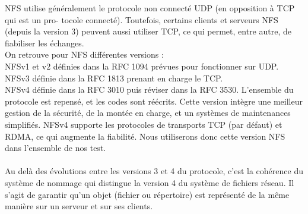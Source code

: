 \documentclass[12pt]{report}
\begin{document}
		NFS utilise généralement le protocole non connecté UDP (en opposition à TCP qui est un pro-
    tocole connecté). Toutefois, certains clients et serveurs NFS (depuis la version 3) peuvent aussi
    utiliser TCP, ce qui permet, entre autre, de fiabiliser les échanges.\\

    On retrouve pour NFS différentes versions :\\
    NFSv1 et v2 définies dans la RFC 1094 prévues pour fonctionner sur UDP.\\
    NFSv3 définie dans la RFC 1813 prenant en charge le TCP.\\
    NFSv4 définie dans la RFC 3010 puis réviser dans la RFC 3530. L'ensemble du protocole est repensé, et les codes sont réécrits.
    Cette version intègre une meilleur gestion de la sécurité, de la montée en charge, et un systèmes de maintenances simplifiés.
    NFSv4 supporte les protocoles de transports TCP (par défaut) et RDMA, ce qui augmente la fiabilité. Nous utiliserons donc cette version NFS dans l'ensemble de nos test.\\\\
Au delà des évolutions entre les versions 3 et 4 du protocole, c'est la cohérence du système de nommage qui distingue la version 4 du système de fichiers réseau. Il s'agit de garantir qu'un objet (fichier ou répertoire) est représenté de la même manière sur un serveur et sur ses clients.
\newpage
\end{document}
